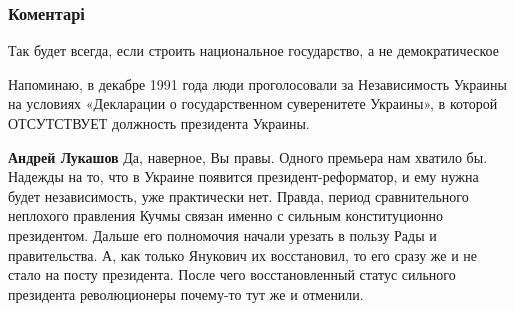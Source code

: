  
 
 
 
 
\subsubsection{Коментарі}

\begin{itemize}
 
Так будет всегда, если строить национальное государство, а не демократическое

 

Напоминаю, в декабре 1991 года люди проголосовали за Независимость Украины на
условиях «Декларации о государственном суверенитете Украины», в которой
ОТСУТСТВУЕТ должность президента Украины.

\begin{itemize}
 
\textbf{Андрей Лукашов} Да, наверное, Вы правы. Одного премьера нам хватило бы.
Надежды на то, что в Украине появится президент-реформатор, и ему нужна будет
независимость, уже практически нет. Правда, период сравнительного неплохого
правления Кучмы связан именно с сильным конституционно президентом. Дальше его
полномочия начали урезать в пользу Рады и правительства. А, как только Янукович
их восстановил, то его сразу же и не стало на посту президента. После чего
восстановленный статус сильного президента революционеры почему-то тут же и
отменили.
\end{itemize}


\end{itemize}
